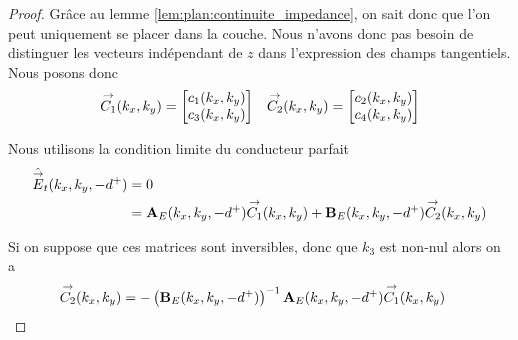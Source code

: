         \begin{proof}
            Grâce au lemme \eqref{lem:plan:continuite_impedance}, on sait donc que l'on peut uniquement se placer dans la couche. Nous n'avons donc pas besoin de distinguer les vecteurs indépendant de \(z\) dans l'expression des champs tangentiels. Nous posons donc
            \begin{align*}
                {\overset{\rightarrow}{C_1}}(k_x,k_y) = \begin{bmatrix}c_1(k_x,k_y) \\ c_3(k_x,k_y)\end{bmatrix} 
                && 
                {\overset{\rightarrow}{C_2}}(k_x,k_y) = \begin{bmatrix}c_2(k_x,k_y) \\ c_4(k_x,k_y)\end{bmatrix}
            \end{align*}

            Nous utilisons la condition limite du conducteur parfait
            \begin{align*}
                \hat{{\overset{\rightarrow}{E}}}_t(k_x,k_y,-d^+) &= 0
                \\
                &=  \mathbf{A}_E(k_x,k_y,-d^+){\overset{\rightarrow}{C_1}}(k_x,k_y) + \mathbf{B}_E(k_x,k_y,-d^+){\overset{\rightarrow}{C_2}}(k_x,k_y)
            \end{align*}

            Si on suppose que ces matrices sont inversibles, donc que \(k_3\) est non-nul alors on a
            \begin{align*}
                {\overset{\rightarrow}{C_2}}(k_x,k_y) &= -\left(\mathbf{B}_E(k_x,k_y,-d^+)\right)^{-1}\mathbf{A}_E(k_x,k_y,-d^+){\overset{\rightarrow}{C_1}}(k_x,k_y)
            \end{align*}


\end{proof}
